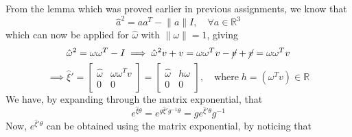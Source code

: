 From the lemma which was proved earlier in previous assignments, we know that
\begin{equation*}
      {\hat{a}}^2 = a a^T - \lVert a \rVert I, \quad \forall a \in \mathbb{R}^3
\end{equation*}
which can now be applied for \( \hat \omega \) with \( \lVert \omega \rVert = 1 \), giving
\begin{equation*}
      {\hat{\omega}}^2
      =
      \omega \omega^T - I
      \implies
      {\hat{\omega}}^2 v + v
      =
      \omega \omega^T v - \cancel{v} + \cancel{v}
      =
      \omega \omega^T v
\end{equation*}
\begin{equation*}
      \implies
      \hat{\xi}'
      =
      \begin{bmatrix}
            \hat \omega & \omega \omega^T v \\
            0           & 0
      \end{bmatrix}
      =
      \begin{bmatrix}
            \hat \omega & h \omega \\
            0           & 0
      \end{bmatrix},
      \quad \text{where} \; h = (\omega^T v) \in \mathbb{R}
\end{equation*}
We have, by expanding through the matrix exponential, that
\begin{equation*}
      e^{\hat{\xi} \theta}
      =
      e^{g \hat{\xi}' g^{-1} \theta}
      =
      g e^{\hat{\xi}' \theta} g^{-1}
\end{equation*}
Now, \( e^{\hat{\xi}' \theta} \) can be obtained using the matrix exponential, by noticing that
